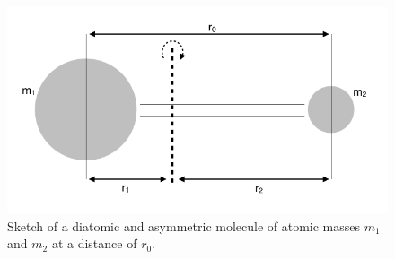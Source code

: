 \documentclass[a4paper,fleqn]{article}
\begin{document}
\begin{figure}[htbp]
\begin{center}
\includegraphics[width=1\textwidth]{figures/Reduced_mass}
\caption{Sketch of a diatomic and asymmetric molecule of atomic masses $m_1$ and $m_2$ at a distance of $r_0$.}
\label{Reduced_mass}
\end{center}
\end{figure}
\end{document}
